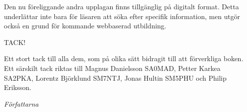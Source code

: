 Den nu föreliggande andra upplagan finns tillgänglig på digitalt format. Detta underlättar inte bara för läsaren att söka efter specifik information, men utgör också en grund för kommande webbaserad utbildning.



TACK!

Ett stort tack till alla dem, som på olika sätt bidragit till att förverkliga
boken. Ett särskilt tack riktas till Magnus Danielsson SA0MAD, Petter Karkea SA2PKA, Lorentz Björklund SM7NTJ, Jonas Hultin SM5PHU och Philip Eriksson.

\emph{Författarna}
